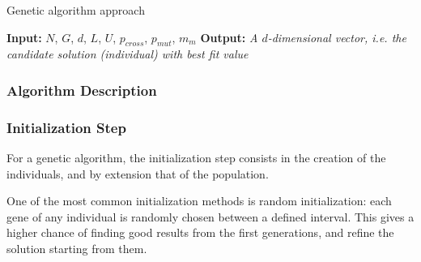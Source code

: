 \begin{algorithm}
	\caption{Genetic algorithm approach} \label{alg:ga}
	\begin{algorithmic}
		\newline
		\textbf{Input:} $N$, $G$, $d$, $L$, $U$, $p_{cross}$, $p_{mut}$, $m_m$\newline
		\textbf{Output:} \textit{A $d$-dimensional vector, i.e. the candidate solution (individual) with best fit value}
					\EndIf
				\EndFor
			\EndFor
		\EndProcedure
	\end{algorithmic}	
\end{algorithm}

\subsubsection{Algorithm Description}


\label{sec:5.steps}
\subsubsection{Initialization Step}

For a genetic algorithm, the initialization step consists in the creation
of the individuals, and by extension that of the population.

One of the most common initialization methods is random initialization:
each gene of any individual is randomly chosen between a defined interval.
This gives a higher chance of finding good results from the first generations,
and refine the solution starting from them.

